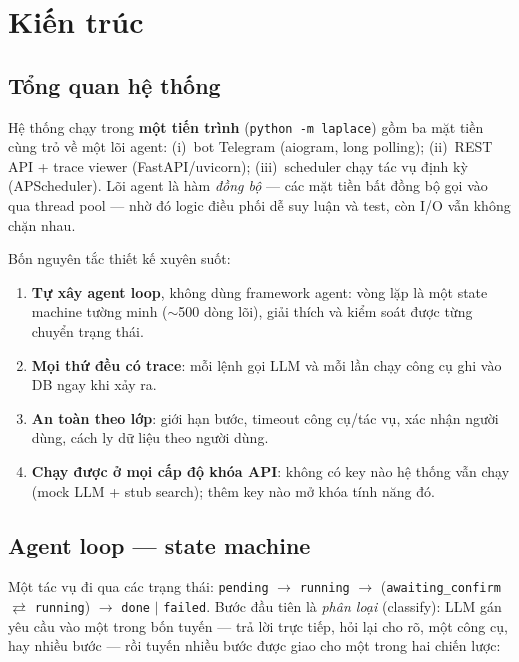 \section{Kiến trúc}
\label{sec:kien-truc}

\subsection{Tổng quan hệ thống}

Hệ thống chạy trong \textbf{một tiến trình} (\texttt{python -m laplace}) gồm ba
mặt tiền cùng trỏ về một lõi agent: (i)~bot Telegram (aiogram, long polling);
(ii)~REST API + trace viewer (FastAPI/uvicorn); (iii)~scheduler chạy tác vụ
định kỳ (APScheduler). Lõi agent là hàm \emph{đồng bộ} --- các mặt tiền bất
đồng bộ gọi vào qua thread pool --- nhờ đó logic điều phối dễ suy luận và test,
còn I/O vẫn không chặn nhau.


Bốn nguyên tắc thiết kế xuyên suốt:

\begin{enumerate}
  \item \textbf{Tự xây agent loop}, không dùng framework agent: vòng lặp là một
        state machine tường minh ($\sim$500 dòng lõi), giải thích và kiểm soát
        được từng chuyển trạng thái.
  \item \textbf{Mọi thứ đều có trace}: mỗi lệnh gọi LLM và mỗi lần chạy công cụ
        ghi vào DB ngay khi xảy ra.
  \item \textbf{An toàn theo lớp}: giới hạn bước, timeout công cụ/tác vụ, xác
        nhận người dùng, cách ly dữ liệu theo người dùng.
  \item \textbf{Chạy được ở mọi cấp độ khóa API}: không có key nào hệ thống vẫn
        chạy (mock LLM + stub search); thêm key nào mở khóa tính năng đó.
\end{enumerate}

\subsection{Agent loop --- state machine}

Một tác vụ đi qua các trạng thái:
\texttt{pending} $\to$ \texttt{running} $\to$ (\texttt{awaiting\_confirm}
$\rightleftarrows$ \texttt{running}) $\to$ \texttt{done} $\mid$
\texttt{failed}. Bước đầu tiên là \emph{phân loại} (classify): LLM gán yêu cầu
vào một trong bốn tuyến --- trả lời trực tiếp, hỏi lại cho rõ, một công cụ, hay
nhiều bước --- rồi tuyến nhiều bước được giao cho một trong hai chiến lược:

